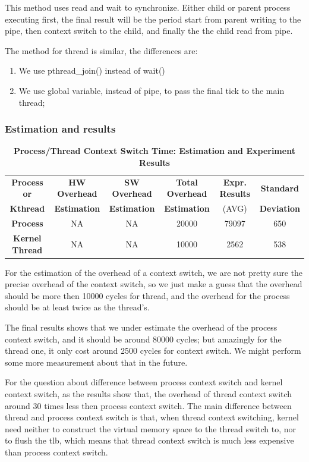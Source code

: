 This method uses read and wait to synchronize. Either child or parent process executing first, the final result will be the period start from parent writing to the pipe, then context switch to the child, and finally the the child read from pipe.

The method for thread is similar, the differences are:

\begin{enumerate}
    \item We use pthread\_join() instead of wait()
    \item We use global variable, instead of pipe, to pass the final tick to the main thread;
\end{enumerate}


\subsubsection{Estimation and results}
\begin{table}[ht]
    \centering
    \caption{\textbf{Process/Thread Context Switch Time: Estimation and Experiment Results}}
    \begin{threeparttable}
        \begin{tabular}{cccccc}
        \hline
        \textbf{Process or} & \textbf{HW Overhead} & \textbf{SW Overhead } & \textbf{Total Overhead} & \textbf{Expr.        Results} & \textbf{Standard} \\
        \textbf{Kthread} & \textbf{Estimation}       &  \textbf{Estimation}         & \textbf{Estimation}  & (AVG)   & \textbf{Deviation}\\
        \hline
        \textbf{Process} & NA & NA & 20000 & 79097  &  650\\
        \textbf{Kernel Thread} & NA & NA & 10000 & 2562 & 538\\
        \hline
        \end{tabular}
    \end{threeparttable}
    \label{context_switch_time}
\end{table}

For the estimation of the overhead of a context switch, we are not pretty sure the precise overhead of the context switch, so we just make a guess that the overhead should be more then 10000 cycles for thread, and the overhead for the process should be at least twice as the thread's.

The final results shows that we under estimate the overhead of the process context switch, and it should be around 80000 cycles; but amazingly for the thread one, it only cost around 2500 cycles for context switch. We might perform some more measurement about that in the future.

For the question about difference between process context switch and kernel context switch, as the results show that, the overhead of thread context switch around 30 times less then process context switch. The main difference between thread and process context switch
is that, when thread context switching, kernel need neither to construct the virtual memory space to the thread switch to, nor to flush the tlb, which means that thread context switch is much less expensive than process context switch.
